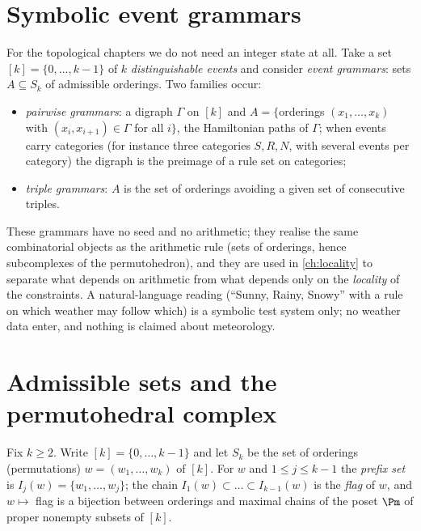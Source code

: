 \section{Symbolic event grammars}\label{sec:symbolic}
For the topological chapters we do not need an integer state at all. Take a set $[k]=\{0,\dots,k-1\}$ of $k$ \emph{distinguishable events} and consider \emph{event grammars}: sets $A\subseteq S_k$ of admissible orderings. Two families occur:
\begin{itemize}
\item \emph{pairwise grammars}: a digraph $\Gamma$ on $[k]$ and $A=\{$orderings $(x_1,\dots,x_k)$ with $(x_i,x_{i+1})\in\Gamma$ for all $i\}$, the Hamiltonian paths of $\Gamma$; when events carry categories (for instance three categories $S,R,N$, with several events per category) the digraph is the preimage of a rule set on categories;
\item \emph{triple grammars}: $A$ is the set of orderings avoiding a given set of consecutive triples.
\end{itemize}
These grammars have no seed and no arithmetic; they realise the same combinatorial objects as the arithmetic rule (sets of orderings, hence subcomplexes of the permutohedron), and they are used in \cref{ch:locality} to separate what depends on arithmetic from what depends only on the \emph{locality} of the constraints. A natural-language reading (``Sunny, Rainy, Snowy'' with a rule on which weather may follow which) is a symbolic test system only; no weather data enter, and nothing is claimed about meteorology.

\section{Admissible sets and the permutohedral complex}\label{sec:complex}
Fix $k\ge2$. Write $[k]=\{0,\dots,k-1\}$ and let $S_k$ be the set of orderings (permutations) $w=(w_1,\dots,w_k)$ of $[k]$. For $w$ and $1\le j\le k-1$ the \emph{prefix set} is $I_j(w)=\{w_1,\dots,w_j\}$; the chain $I_1(w)\subset\dots\subset I_{k-1}(w)$ is the \emph{flag} of $w$, and $w\mapsto$ flag is a bijection between orderings and maximal chains of the poset $\Pm$ of proper nonempty subsets of $[k]$.

